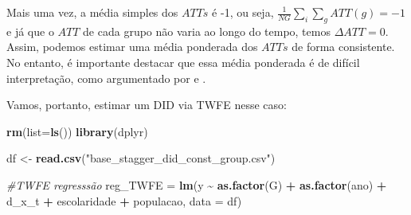 \documentclass[portugues]{article}
\newenvironment{Shaded}{\begin{snugshade}}{\end{snugshade}}
\newcommand{\AttributeTok}[1]{\textcolor[rgb]{0.13,0.29,0.53}{#1}}
\newcommand{\CommentTok}[1]{\textcolor[rgb]{0.56,0.35,0.01}{\textit{#1}}}
\newcommand{\FunctionTok}[1]{\textcolor[rgb]{0.13,0.29,0.53}{\textbf{#1}}}
\newcommand{\NormalTok}[1]{#1}
\newcommand{\OtherTok}[1]{\textcolor[rgb]{0.56,0.35,0.01}{#1}}
\newcommand{\SpecialCharTok}[1]{\textcolor[rgb]{0.81,0.36,0.00}{\textbf{#1}}}
\newcommand{\StringTok}[1]{\textcolor[rgb]{0.31,0.60,0.02}{#1}}
\begin{document}
\begin{boxA}
\begin{center}
\end{center}

Mais uma vez, a média simples dos $ATTs$ é -1, ou seja, $\frac{1}{NG}\sum_i \sum_g ATT(g) = -1$ e já que o $ATT$ de cada grupo não varia ao longo do tempo, temos $\Delta ATT = 0$. Assim, podemos estimar uma média ponderada dos $ATTs$ de forma consistente. No entanto, é importante destacar que essa média ponderada é de difícil interpretação, como argumentado por \cite{goodman2021difference} e \cite{callaway2021difference}.

Vamos, portanto, estimar um DID via TWFE nesse caso:

\begin{Shaded}
\begin{Highlighting}[]
\FunctionTok{rm}\NormalTok{(}\AttributeTok{list=}\FunctionTok{ls}\NormalTok{())}
\FunctionTok{library}\NormalTok{(dplyr)}

\NormalTok{df }\OtherTok{\textless{}{-}} \FunctionTok{read.csv}\NormalTok{(}\StringTok{"base\_stagger\_did\_const\_group.csv"}\NormalTok{)}
\end{Highlighting}
\end{Shaded}

\begin{Shaded}
\begin{Highlighting}[]
\CommentTok{\#TWFE regresssão}
\NormalTok{reg\_TWFE }\OtherTok{=} \FunctionTok{lm}\NormalTok{(y }\SpecialCharTok{\textasciitilde{}} \FunctionTok{as.factor}\NormalTok{(G) }\SpecialCharTok{+} \FunctionTok{as.factor}\NormalTok{(ano) }\SpecialCharTok{+}\NormalTok{ d\_x\_t }\SpecialCharTok{+}
\NormalTok{ escolaridade }\SpecialCharTok{+}\NormalTok{ populacao, }\AttributeTok{data =}\NormalTok{ df)}


\end{Highlighting}
\end{Shaded}
\end{boxA}
\end{document}
